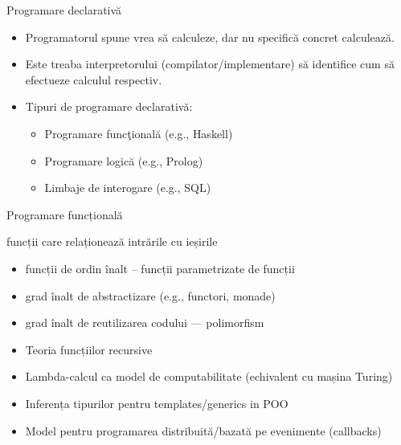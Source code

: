 \documentclass[xcolor=x11names,compress,10pt]{beamer}
\begin{document}
\begin{frame}{Programare declarativ\u a}

	\begin{itemize}
		\item Programatorul spune  vrea s\u a calculeze, dar nu specific\u a concret  calculeaz\u a.
		\medskip
		\item Este treaba interpretorului (compilator/implementare) s\u a identifice cum s\u a efectueze calculul respectiv.
		\medskip
		\item Tipuri de programare declarativ\u a:
		\begin{itemize}
			\item Programare func\c tional\u a (e.g., Haskell)
			\item Programare logic\u a (e.g., Prolog)
			\item Limbaje de interogare (e.g., SQL)
			
		\end{itemize}
	\end{itemize}
\end{frame}

\begin{frame}{Programare funcțională}
	\begin{description}
		\vfill\item[Esență:] funcții care relaționează intrările cu ieșirile
		\vfill\item[Caracteristici:]
		\begin{itemize}
			\item funcții de ordin înalt -- funcții parametrizate de funcții
			\item grad înalt de abstractizare (e.g., functori, monade)
			\item grad înalt de reutilizarea codului --- polimorfism
		\end{itemize}
		\vfill\item[Fundamente:]
		\begin{itemize}
			\item Teoria funcțiilor recursive
			\item Lambda-calcul ca model de computabilitate (echivalent cu mașina Turing)
		\end{itemize}
		\vfill\item[Inspirație:]
		\begin{itemize}
			\item Inferența tipurilor pentru templates/generics in POO
			\item Model pentru programarea distribuită/bazată pe evenimente (callbacks)
		\end{itemize}
	\end{description}
\end{frame}
\end{document}
